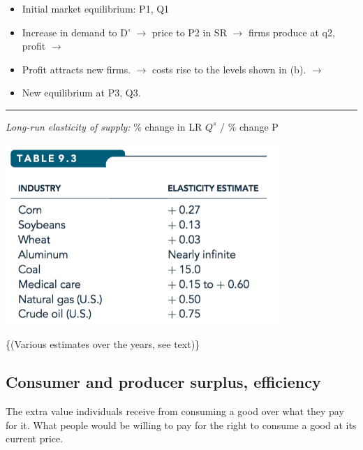 \documentclass[]{article}
\providecommand{\tightlist}{%
  \setlength{\itemsep}{0pt}\setlength{\parskip}{0pt}}
\begin{document}
\begin{itemize}
\item
  Initial market equilibrium: P1, Q1\\
\item
  Increase in demand to D' \(\rightarrow\) price to P2 in SR
  \(\rightarrow\) firms produce at q2, profit \(\rightarrow\)\\
\item
  Profit attracts new firms. \(\rightarrow\) costs rise to the levels
  shown in (b). \(\rightarrow\)\\
\item
  New equilibrium at P3, Q3.
\end{itemize}

\begin{center}\rule{0.5\linewidth}{\linethickness}\end{center}

\emph{Long-run elasticity of supply:} \% change in LR \(Q^s\) / \%
change P

\includegraphics[height=2.7in]{picsfigs/lr_supplyelast_ests.png}

\footnotesize\{(Various estimates over the years, see text)\}

\hypertarget{consumer-and-producer-surplus-efficiency}{%
\subsection{Consumer and producer surplus,
efficiency}\label{consumer-and-producer-surplus-efficiency}}

\begin{description}
\tightlist
\item[Consumer surplus (reprise)]
The extra value individuals receive from consuming a good over what they
pay for it. What people would be willing to pay for the right to consume
a good at its current price.
\end{description}
\end{document}
